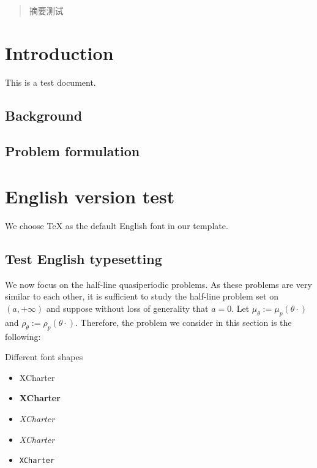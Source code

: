 \documentclass{mythesis}
\begin{document}
\maketitle

\frontmatter

\begin{abstract}
    摘要测试
\end{abstract}

\tableofcontents

\mainmatter

\chapter{Introduction} \label{chp:intro}

This is a test document.

\lipsum[1-3]

\section{Background}

\lipsum[4-6]

\section{Problem formulation}

\lipsum[7-8]

\chapter{English version test}

We choose TeX as the default English font in our template.

\section{Test English typesetting}

We now focus on the half-line quasiperiodic problems. As these problems are very 
similar to each other, it is sufficient to study the half-line problem set on 
$(a, +\infty)$ and suppose without loss of generality that $a = 0$. Let 
$\mu_{\theta} := \mu_{p}(\theta \cdot)$ and $\rho_{\theta} := \rho_{p}(\theta \cdot)$. 
Therefore, the problem we consider in this section is the following:

Different font shapes
\begin{itemize}
    \item XCharter
    \item \textbf{XCharter}
    \item \textit{XCharter}
    \item \textsl{XCharter}
    \item \texttt{XCharter}
\end{itemize}
\end{document}
